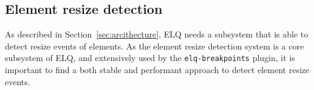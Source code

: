 \documentclass[a4paper,11pt]{kth-mag}
\newcommand{\code}[1]{\texttt{#1}}
\begin{document}
      \subsection{Element resize detection}\label{sec:imp_erd}
        As described in Section~\ref{sec:arcithecture}, \gls{ELQ} needs a subsystem that is able to detect resize events of \glspl{element}.
        As the \gls{element} resize detection system is a core subsystem of \gls{ELQ}, and extensively used by the \code{elq-breakpoints} plugin, it is important to find a both stable and performant approach to detect \gls{element} resize events.
\end{document}
